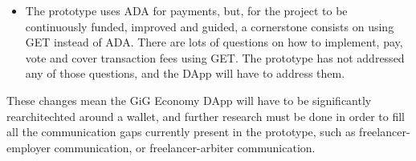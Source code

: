 \documentclass{article}
\begin{document}
\begin{itemize}
  \item The prototype uses ADA for payments, but, for the project to be continuously funded, improved and guided, a cornerstone consists on using GET instead of ADA. There are lots of questions on how to implement, pay, vote and cover transaction fees using GET. The prototype has not addressed any of those questions, and the DApp will have to address them.
\end{itemize}

These changes mean the GiG Economy DApp will have to be significantly rearchitechted around a wallet, and further research must be done in order to fill all the communication gaps currently present in the prototype, such as freelancer-employer communication, or freelancer-arbiter communication.
\end{document}
